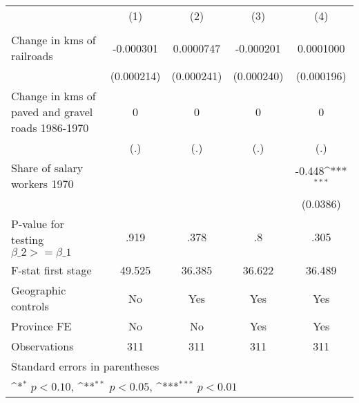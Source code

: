 {
\def\sym#1{\ifmmode^{#1}\else\(^{#1}\)\fi}
\begin{tabular}{l*{4}{c}}
\hline\hline
                &\multicolumn{1}{c}{(1)}&\multicolumn{1}{c}{(2)}&\multicolumn{1}{c}{(3)}&\multicolumn{1}{c}{(4)}\\
                &\multicolumn{1}{c}{}&\multicolumn{1}{c}{}&\multicolumn{1}{c}{}&\multicolumn{1}{c}{}\\
\hline
Change in kms of railroads&-0.000301         &0.0000747         &-0.000201         &0.0001000         \\
                &(0.000214)         &(0.000241)         &(0.000240)         &(0.000196)         \\
[1em]
Change in kms of paved and gravel roads 1986-1970&        0         &        0         &        0         &        0         \\
                &      (.)         &      (.)         &      (.)         &      (.)         \\
[1em]
Share of salary workers 1970&                  &                  &                  &   -0.448\sym{***}\\
                &                  &                  &                  & (0.0386)         \\
\hline
P-value for testing $\beta\_{2} >= \beta\_{1}$&     .919         &     .378         &       .8         &     .305         \\
F-stat first stage&   49.525         &   36.385         &   36.622         &   36.489         \\
Geographic controls&       No         &      Yes         &      Yes         &      Yes         \\
Province FE     &       No         &       No         &      Yes         &      Yes         \\
Observations    &      311         &      311         &      311         &      311         \\
\hline\hline
\multicolumn{5}{l}{\footnotesize Standard errors in parentheses}\\
\multicolumn{5}{l}{\footnotesize \sym{*} \(p<0.10\), \sym{**} \(p<0.05\), \sym{***} \(p<0.01\)}\\
\end{tabular}
}
